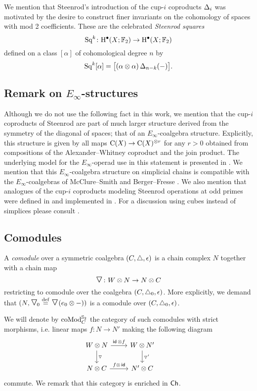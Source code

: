 We mention that Steenrod's introduction of the cup-$i$ coproducts $\operatorname{\Delta}_i$ was motivated by the desire to construct finer invariants on the cohomology of spaces with mod 2 coefficients.
These are the celebrated \textit{Steenrod squares}
\[
\operatorname{Sq}^k \colon \mathrm{H}^\bullet(X; {\mathbb{F}_2}) \to \mathrm{H}^\bullet(X; {\mathbb{F}_2})
\]
defined on a class $[\alpha]$ of cohomological degree $n$ by
\[
\operatorname{Sq}^k [\alpha] = \big[ (\alpha \otimes \alpha) \operatorname{\Delta}_{n-k}(-) \big].
\]

\subsection{Remark on $E_\infty$-structures}

Although we do not use the following fact in this work, we mention that the cup-$i$ coproducts of Steenrod are part of much larger structure derived from the symmetry of the diagonal of spaces; that of an $E_\infty$-coalgebra structure.
Explicitly, this structure is given by all maps $\operatorname{C}(X) \to \operatorname{C}(X)^{\otimes r}$ for any $r > 0$ obtained from compositions of the Alexander--Whitney coproduct and the join product.
The underlying model for the $E_\infty$-operad use in this statement is presented in \cite{medina2020prop1, medina2021prop2}.
We mention that this $E_\infty$-coalgebra structure on simplicial chains is compatible with the $E_\infty$-coalgebras of McClure--Smith \cite{mcclure2003multivariable} and Berger--Fresse \cite{berger2004combinatorial}.
We also mention that analogues of the cup-$i$ coproducts modeling Steenrod operations at odd primes were defined in \cite{medina2021may_st} and implemented in \cite{medina2021comch}.
For a discussion using cubes instead of simplices please consult \cite{medina2021cubical}.

\subsection{Comodules}

A \textit{comodule} over a symmetric coalgebra $(C, \triangle, \operatorname{\epsilon})$ is a chain complex $N$ together with a chain map
\[
\text{\Large$\triangledown$} \colon W \otimes N \to N \otimes C
\]
restricting to comodule over the coalgebra $(C, \triangle_0, \operatorname{\epsilon})$.
More explicitly, we
demand that $(N, \text{\Large$\triangledown$}_{\!0} \stackrel{\mathrm{def}}{=} \text{\Large$\triangledown$}(e_0 \otimes -))$ is a comodule over $(C, \triangle_0, \operatorname{\epsilon})$.

We will denote by $\operatorname{coMod}_C^{\mathbb{S}_2}$ the category of such comodules with strict morphisms, i.e. linear maps $f \colon N \to N'$ making the following diagram
\[
\begin{tikzcd}
	W \ot N \arrow[d, "\triangledown"] \arrow[r, "\id\, \ot f"] &
	W \ot N' \arrow[d, "\triangledown'"] & \\
	N \ot C \arrow[r, "f \ot\, \id"] &
	N' \ot C
\end{tikzcd}
\]
commute.
We remark that this category is enriched in $\mathsf{Ch}$.

